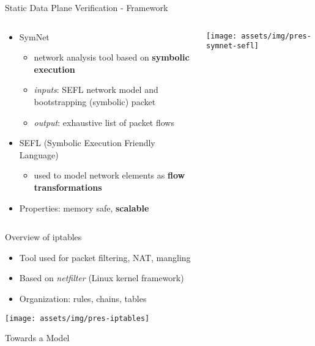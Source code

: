 \documentclass{beamer}
\begin{document}
\begin{frame}[t]{Static Data Plane Verification - Framework}
  \begin{columns}
    \begin{column}{.6\textwidth}
      \begin{itemize}
        \item SymNet
          \begin{itemize}
            \item network analysis tool based on \textbf{symbolic execution}
            \item \emph{inputs}: SEFL network model and bootstrapping
              (symbolic) packet
            \item \emph{output}: exhaustive list of packet flows
          \end{itemize}
        \item SEFL (Symbolic Execution Friendly Language)
          \begin{itemize}
            \item used to model network elements as \textbf{flow
              transformations}
          \end{itemize}
        \item Properties: memory safe, \textbf{scalable}
      \end{itemize}
    \end{column}

    \begin{column}{.4\textwidth}
      \centering
      \texttt{[image: assets/img/pres-symnet-sefl]}
    \end{column}
  \end{columns}
\end{frame}

\begin{frame}{Overview of iptables}
  \begin{itemize}
    \item Tool used for packet filtering, NAT, mangling
    \item Based on \emph{netfilter} (Linux kernel framework)
    \item Organization: rules, chains, tables
  \end{itemize}

  \centering
  \texttt{[image: assets/img/pres-iptables]}
\end{frame}

\begin{frame}{Towards a Model}
\end{frame}
\end{document}

